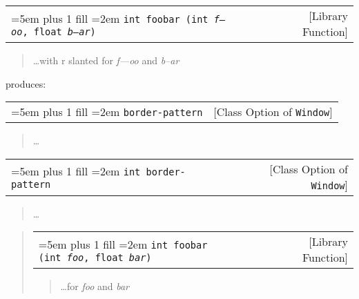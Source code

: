 \documentclass{book}
\newcommand\GNUTexinfocommandstyletextvar[1]{{\normalfont{}\textsl{#1}}}%
\begin{document}
\noindent\begin{tabularx}{\linewidth}{@{}Xr}
\rightskip=5em plus 1 fill
\hangindent=2em
\texttt{int foobar (int\ \textnormal{\textsl{f---oo}},\ float\ \textnormal{\textsl{b--ar}})}& [Library Function]
\end{tabularx}

%
\begin{quote}
\unskip{\parskip=0pt\noindent}%
\dots{}\@ with r slanted for \GNUTexinfocommandstyletextvar{f---oo} and \GNUTexinfocommandstyletextvar{b--ar}
\end{quote}

\noindent{}produces:

\noindent\begin{tabularx}{\linewidth}{@{}Xr}
\rightskip=5em plus 1 fill
\hangindent=2em
\texttt{border-pattern}& [Class Option of \texttt{Window}]
\end{tabularx}

%
\begin{quote}
\unskip{\parskip=0pt\noindent}%
\dots{}\@
\end{quote}


\noindent\begin{tabularx}{\linewidth}{@{}Xr}
\rightskip=5em plus 1 fill
\hangindent=2em
\texttt{\texttt{int} border-pattern}& [Class Option of \texttt{Window}]
\end{tabularx}

%
\begin{quote}
\unskip{\parskip=0pt\noindent}%
\dots{}\@
\end{quote}

\begin{quote}

\noindent\begin{tabularx}{\linewidth}{@{}Xr}
\rightskip=5em plus 1 fill
\hangindent=2em
\texttt{int foobar (int\ \GNUTexinfocommandstyletextvar{foo},\ float\ \GNUTexinfocommandstyletextvar{bar})}& [Library Function]
\end{tabularx}

%
\begin{quote}
\unskip{\parskip=0pt\noindent}%
\dots{}\@ for \GNUTexinfocommandstyletextvar{foo} and \GNUTexinfocommandstyletextvar{bar}
\end{quote}
\end{quote}
\end{document}
